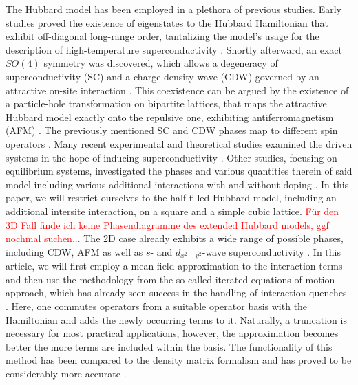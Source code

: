 \documentclass[
    reprint, 
    aps,
    preprintnumbers,
    twocolumn,
    prb,
    superscriptaddress
]{revtex4-2}
\begin{document}
The Hubbard model has been employed in a plethora of previous studies. 
Early studies proved the existence of eigenstates to the Hubbard Hamiltonian that exhibit off-diagonal long-range order,
tantalizing the model's usage for the description of high-temperature superconductivity \cite{yang89}.
Shortly afterward, an exact $SO(4)$ symmetry was discovered,
which allows a degeneracy of superconductivity (SC) and a charge-density wave (CDW) governed by an attractive on-site interaction \cite{yang90}.
This coexistence can be argued by the existence of a particle-hole transformation on bipartite lattices, 
that maps the attractive Hubbard model exactly onto the repulsive one, exhibiting antiferromagnetism (AFM) \cite{Hirsch85}.
The previously mentioned SC and CDW phases map to different spin operators \cite{zitko15,lieb89}.
\newline
Many recent experimental and theoretical studies examined the driven systems in the hope of inducing superconductivity 
\cite{Nicoletti14,Krull14,Moor14,Casandruc15,patel16,sentef17,Buenemann17}.
Other studies, focusing on equilibrium systems, 
investigated the phases and various quantities therein of said model including various additional interactions with and without doping 
\cite{Micnas88,Micnas88b,Micnas89,Dzierzawa92,Kostyrko92,Eriksson95,Staudt00,Onari04,Toschi05,Brackett16,Paki19,romer20,Sushchyev22}.
In this paper, we will restrict ourselves to the half-filled Hubbard model, including an additional intersite interaction, on a square and a simple cubic lattice.
\textcolor{red}{Für den 3D Fall finde ich keine Phasendiagramme des extended Hubbard models, ggf nochmal suchen...}
The 2D case already exhibits a wide range of possible phases, including CDW, AFM as well as $s$- and $d_{x^2 - y^2}$-wave superconductivity
\cite{Micnas88b,Tsuchiura95,Su01,Su04,ha11,Huang13,Jiang22}.
\newline
In this article, we will first employ a mean-field approximation to the interaction terms 
and then use the methodology from the so-called iterated equations of motion approach,
which has already seen success in the handling of interaction quenches \cite{uhrig09,hamerla13,hamerla14,bleicker18}.
Here, one commutes operators from a suitable operator basis with the Hamiltonian and adds the newly occurring terms to it.
Naturally, a truncation is necessary for most practical applications, however, the approximation becomes better the more terms are included within the basis.
The functionality of this method has been compared to the density matrix formalism and has proved to be considerably more accurate \cite{Kalthoff17}.
\end{document}
